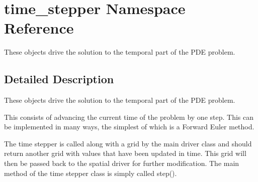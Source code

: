\hypertarget{namespacetime__stepper}{}\section{time\+\_\+stepper Namespace Reference}
\label{namespacetime__stepper}


These objects drive the solution to the temporal part of the P\+DE problem.  




\subsection{Detailed Description}
These objects drive the solution to the temporal part of the P\+DE problem. 

This consists of advancing the current time of the problem by one step. This can be implemented in many ways, the simplest of which is a Forward Euler method.

The time stepper is called along with a grid by the main driver class and should return another grid with values that have been updated in time. This grid will then be passed back to the spatial driver for further modification. The main method of the time stepper class is simply called step(). 